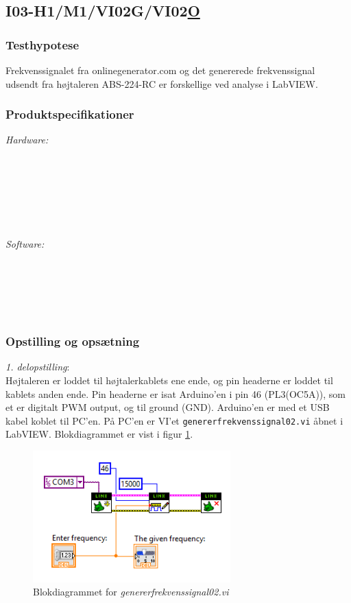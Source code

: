  		\subsection{I03-H1/M1/VI02G/VI02\underline{O}}
		
		\subsubsection{Testhypotese}
		 Frekvenssignalet fra onlinegenerator.com og det genererede frekvenssignal udsendt fra højtaleren ABS-224-RC er forskellige ved analyse i LabVIEW.
		
		\subsubsection{Produktspecifikationer}
		
		\textit{Hardware:}\\
		\\
		\hojtalerkabel\\
		\pins\\
		\krympeflex
		\arduino\\
		\usbkabel\\
		\PC\\
		\mikrofon
	
		\textit{Software:}\\
		\labview\\
		\visa\\
		\vi\\
		\ardsw\\
		\onlineg\\
		
		\subsubsection{Opstilling og opsætning}
		\textit{1. delopstilling}:\\
		Højtaleren er loddet til højtalerkablets ene ende, og pin headerne er loddet til kablets anden ende. 
		Pin headerne er isat Arduino'en i pin 46 (PL3(OC5A)), som et er digitalt PWM output, og til ground (GND). 
		Arduino'en er med et USB kabel koblet til PC'en. 		
		På PC'en er VI'et \texttt{genererfrekvenssignal02.vi} åbnet i LabVIEW. Blokdiagrammet er vist i figur \ref{fig:2gf02}.\\ 
 
 \begin{figure}[htb]
			\centering
				\includegraphics[width=3in]{gf02}
				\caption{Blokdiagrammet for \textit{genererfrekvenssignal02.vi}}	
				\label{fig:2gf02}
			\end{figure} 
			
